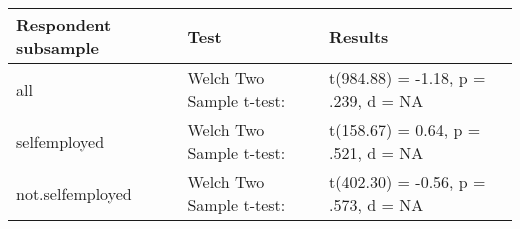 \begin{table}[ht]
\centering
\begin{tabular}{lll}
  \hline
Respondent subsample & Test & Results \\ 
  \hline
all & Welch Two Sample t-test: & t(984.88) = -1.18, p = .239, d = NA \\ 
  selfemployed & Welch Two Sample t-test: & t(158.67) = 0.64, p = .521, d = NA \\ 
  not.selfemployed & Welch Two Sample t-test: & t(402.30) = -0.56, p = .573, d = NA \\ 
   \hline
\end{tabular}
\end{table}
